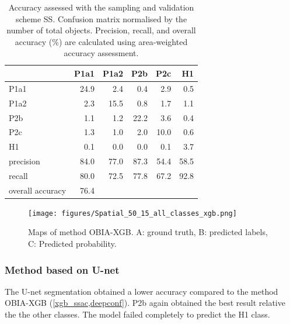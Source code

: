 \documentclass{isprs} %
\begin{document}
\begin{table}[]
    \centering
\begin{tabular}{lrrrrr}
\toprule
{} &  P1a1 &  P1a2 &  P2b &  P2c &   H1 \\
\midrule
P1a1             &  24.9 &   2.4 &  0.4 &  2.9 &  0.5 \\
P1a2             &   2.3 &  15.5 &  0.8 &  1.7 &  1.1 \\
P2b              &   1.1 &   1.2 & 22.2 &  3.6 &  0.4 \\
P2c              &   1.3 &   1.0 &  2.0 & 10.0 &  0.6 \\
H1               &   0.1 &   0.0 &  0.0 &  0.1 &  3.7 \\
\midrule
precision        &  84.0 &  77.0 & 87.3 & 54.4 & 58.5 \\
recall           &  80.0 &  72.5 & 77.8 & 67.2 & 92.8 \\
overall accuracy &  76.4 &       &      &      &      \\
\bottomrule
\end{tabular}
    \caption{Accuracy assessed with the sampling and validation scheme SS. Confusion matrix normalised by the number of total objects. Precision, recall, and overall accuracy (\%) are calculated using area-weighted accuracy assessment.}
    \label{xgb_ss}
\end{table}


 \begin{figure}[!h]
    \centering
    \texttt{[image: figures/Spatial\_50\_15\_all\_classes\_xgb.png]}
    \caption{Maps of method OBIA-XGB. A: ground truth, B: predicted labels, C: Predicted probability.}
    \label{fig:spxgb}
\end{figure}

\subsubsection{Method based on U-net}

The U-net segmentation obtained a lower accuracy compared to the method OBIA-XGB (\cref{xgb_ssac,deepconf}). P2b again obtained the best result relative the the other classes. The model failed completely to predict the H1 class.  
\end{document}
